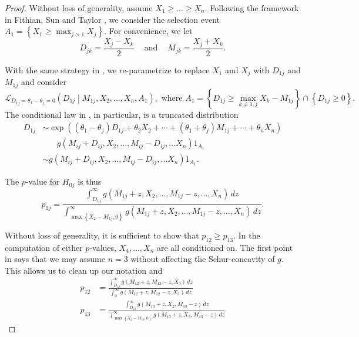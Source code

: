 \documentclass[11pt]{article}
\begin{document}
\begin{proof}

Without loss of generality, assume $X_1 \ge \ldots \ge X_n$. Following the framework in Fithian, Sun and Taylor \cite{Fithian:2014ws}, we consider the selection event $A_1 = \left\{X_1 \ge \max_{j > 1} X_j\right\}$. For convenience, we let
$$D_{jk} = \frac{X_j - X_k}{2} ~~~~ \text{ and } ~~~~ M_{jk} = \frac{X_j + X_k}{2}.$$

With the same strategy in , we re-parametrize to replace $X_1$ and $X_j$ with $D_{1j}$ and $M_{1j}$ and consider
\begin{equation}
\mathcal{L}_{D_{1j} = \theta_1 - \theta_j = 0} \left(D_{1j} \middle| M_{1j}, X_2, \ldots, X_n, A_1\right), \text{ where } A_1 = \left\{D_{1j} \ge \max_{k \ne 1, j} X_k - M_{1j}\right\} \cap \left\{D_{1j} \ge 0\right\}.
\label{eqn:cond_law}
\end{equation}
The conditional law in , in particular, is a truncated distribution
\begin{align*}
D_{1j} & \sim \exp\left(\left(\theta_1 - \theta_j\right) D_{1j} + \theta_2 X_2 + \cdots + \left(\theta_1 + \theta_j\right) M_{1j} + \cdots + \theta_n X_n \right) \\
& ~~~~~~~~ g\left(M_{ij} + D_{ij}, X_2, \ldots, M_{ij} - D_{ij}, \ldots X_n\right) 1_{A_1} \\
& \sim g\left(M_{ij} + D_{ij}, X_2, \ldots, M_{ij} - D_{ij}, \ldots X_n\right) 1_{A_1}.
\end{align*}

The $p$-value for $H_{0j}$ is thus
\begin{equation}
p_{1j} = \frac{\int_{D_{1j}}^\infty g\left(M_{1j} + z, X_2, \ldots, M_{1j} - z, \ldots, X_n\right) \,dz}{\int_{\max\left\{X_2 - M_{1j}, 0\right\}}^\infty g\left(M_{1j} + z, X_2, \ldots, M_{1j} - z, \ldots, X_n\right) \,dz}.
\label{eqn:p1j}
\end{equation}

Without loss of generality, it is sufficient to show that $p_{12} \ge p_{13}$. In the computation of either $p$-values, $X_4, \ldots, X_n$ are all conditioned on. The first point in  says that we may assume $n = 3$ without affecting the Schur-concavity of $g$. This allows us to clean up our notation and
\begin{align*}
p_{12} & = \frac{\int_{D_{12}}^\infty g\left(M_{12} + z, M_{12} - z, X_3\right) \,dz}{\int_0^\infty g\left(M_{12} + z, M_{12} - z, X_3\right) \,dz} \\
p_{13} & = \frac{\int_{D_{13}}^\infty g\left(M_{13} + z, X_2, M_{13} - z\right) \,dz}{\int_{\max\left\{X_2 - M_{13}, 0\right\}}^\infty g\left(M_{13} + z, X_2, M_{13} - z\right) \,dz}
\end{align*}


\end{proof}
\end{document}
